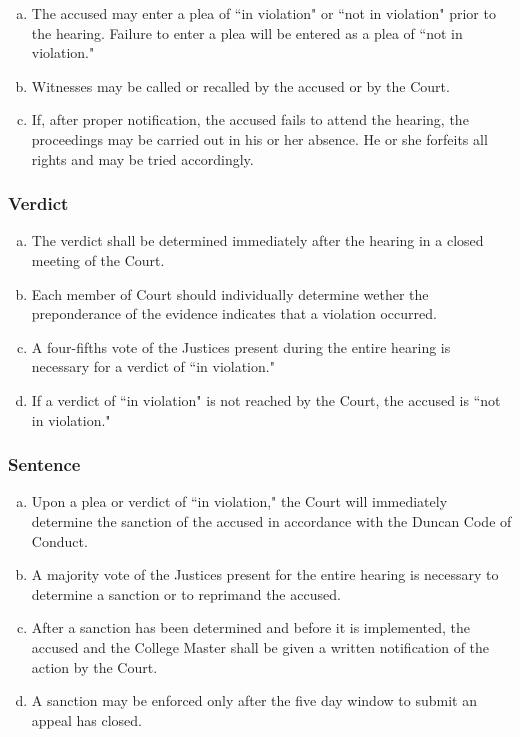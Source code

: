 \documentclass[USletter,12pt]{article}
\begin{document}
\begin{enumerate}[(a)]
\begin{enumerate}[(a)]
\item The accused may enter a plea of ``in violation" or ``not in violation" prior to the hearing.  Failure to enter a plea will be entered as a plea of ``not in violation."
\item Witnesses may be called or recalled by the accused or by the Court.
\item If, after proper notification, the accused fails to attend the hearing, the proceedings may be carried out in his or her absence. He or she forfeits all rights and may be tried accordingly.
\end{enumerate}

\subsubsection{Verdict}
\begin{enumerate}[(a)]
\item The verdict shall be determined immediately after the hearing in a closed meeting of the Court.
\item Each member of Court should individually determine wether the preponderance of the evidence indicates that a violation occurred.
\item A four-fifths vote of the Justices present during the entire hearing is necessary for a verdict of ``in violation."
\item If a verdict of ``in violation" is not reached by the Court, the accused is ``not in violation."
\end{enumerate}

\subsubsection{Sentence}
\begin{enumerate}[(a)]
\item Upon a plea or verdict of ``in violation," the Court will immediately determine the sanction of the accused in accordance with the Duncan Code of Conduct.
\item A majority vote of the Justices present for the entire hearing is necessary to determine a sanction or to reprimand the accused.
\item After a sanction has been determined and before it is implemented, the accused and the College Master shall be given a written notification of the action by the Court.
\item A sanction may be enforced only after the five day window to submit an appeal has closed.
\end{enumerate}


\end{enumerate}
\end{document}
